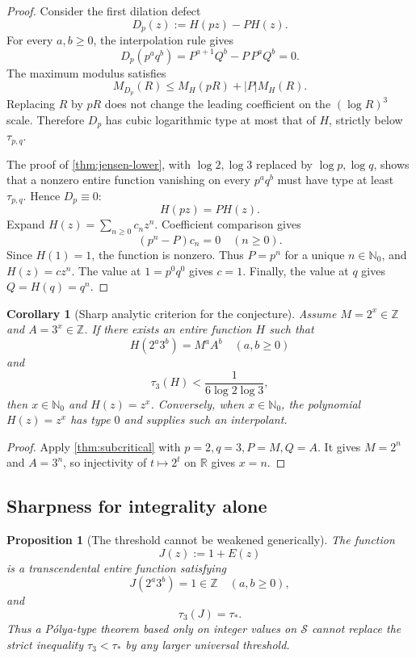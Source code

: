 \documentclass[11pt,oneside]{article}
\newtheorem{proposition}[theorem]{Proposition}
\newtheorem{corollary}[theorem]{Corollary}
\theoremstyle{definition}
\theoremstyle{remark}
\newcommand{\Nzero}{\mathbb N_0}
\newcommand{\Z}{\mathbb Z}
\newcommand{\R}{\mathbb R}
\begin{document}
\begin{proof}
Consider the first dilation defect
\begin{equation}
  D_p(z):=H(pz)-P H(z).
  \label{eq:Dp}
\end{equation}
For every \(a,b\ge0\), the interpolation rule gives
\[
  D_p(p^aq^b)
  =P^{a+1}Q^b-P\,P^aQ^b=0.
\]
The maximum modulus satisfies
\[
  M_{D_p}(R)
  \le M_H(pR)+|P|M_H(R).
\]
Replacing \(R\) by \(pR\) does not change the leading coefficient on the \((\log R)^3\) scale.  Therefore \(D_p\) has cubic logarithmic type at most that of \(H\), strictly below \(\tau_{p,q}\).

The proof of \cref{thm:jensen-lower}, with \(\log2,\log3\) replaced by \(\log p,\log q\), shows that a nonzero entire function vanishing on every \(p^aq^b\) must have type at least \(\tau_{p,q}\).  Hence \(D_p\equiv0\):
\[
  H(pz)=PH(z).
\]
Expand \(H(z)=\sum_{n\ge0}c_nz^n\).  Coefficient comparison gives
\[
  (p^n-P)c_n=0
  \quad(n\ge0).
\]
Since \(H(1)=1\), the function is nonzero.  Thus \(P=p^n\) for a unique \(n\in\Nzero\), and \(H(z)=cz^n\).  The value at \(1=p^0q^0\) gives \(c=1\).  Finally, the value at \(q\) gives \(Q=H(q)=q^n\).
\end{proof}

\begin{corollary}[Sharp analytic criterion for the conjecture]
\label{cor:AE-interp}
Assume \(M=2^x\in\Z\) and \(A=3^x\in\Z\).  If there exists an entire function \(H\) such that
\[
  H(2^a3^b)=M^aA^b
  \quad(a,b\ge0)
\]
and
\[
  \tau_3(H)<\frac1{6\log2\log3},
\]
then \(x\in\Nzero\) and \(H(z)=z^x\).
Conversely, when \(x\in\Nzero\), the polynomial \(H(z)=z^x\) has type \(0\) and supplies such an interpolant.
\end{corollary}

\begin{proof}
Apply \cref{thm:subcritical} with \(p=2,q=3,P=M,Q=A\).  It gives \(M=2^n\) and \(A=3^n\), so injectivity of \(t\mapsto2^t\) on \(\R\) gives \(x=n\).
\end{proof}

\subsection{Sharpness for integrality alone}

\begin{proposition}[The threshold cannot be weakened generically]
\label{prop:sharpness}
The function
\[
  J(z):=1+E(z)
\]
is a transcendental entire function satisfying
\[
  J(2^a3^b)=1\in\Z
  \quad(a,b\ge0),
\]
and
\[
  \tau_3(J)=\tau_*.
\]
Thus a P\'olya-type theorem based only on integer values on \(\mathcal S\) cannot replace the strict inequality \(\tau_3<\tau_*\) by any larger universal threshold.
\end{proposition}
\end{document}
